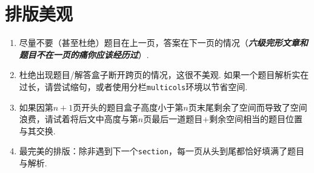 \section{排版美观}
\begin{enumerate}
	\item 尽量不要（甚至杜绝）题目在上一页，答案在下一页的情况（\emph{\textbf{六级完形文章和题目不在一页的痛你应该经历过}}）.
	\item 杜绝出现题目/解答盒子断开跨页的情况，这很不美观. 如果一个题目解析实在过长，请尝试缩句，或者使用分栏\verb|multicols|环境以节省空间.
	\item 如果因第$n+1$页开头的题目盒子高度小于第$n$页末尾剩余了空间而导致了空间浪费，请试着将后文中高度与第$n$页最后一道题目+剩余空间相当的题目位置与其交换.
	\item 最完美的排版：除非遇到下一个\verb|section|，每一页从头到尾都恰好填满了题目与解析.
\end{enumerate}